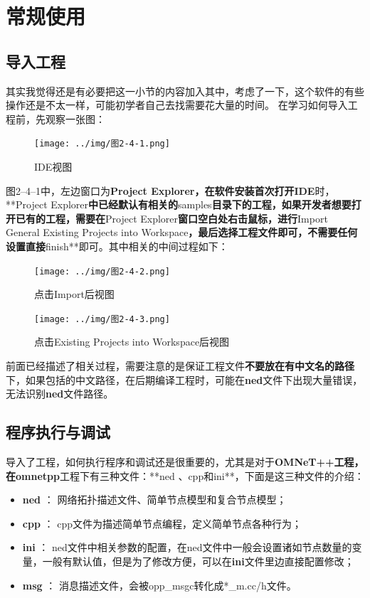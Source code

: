 \section{常规使用}
\label{常规使用}

\subsection{导入工程}
\label{导入工程}

其实我觉得还是有必要把这一小节的内容加入其中，考虑了一下，这个软件的有些操作还是不太一样，可能初学者自己去找需要花大量的时间。
在学习如何导入工程前，先观察一张图：

\begin{figure}[htbp]
\centering
\texttt{[image: ../img/图2-4-1.png]}
\caption{IDE视图}
\end{figure}

图2--4--1中，左边窗口为\textbf{Project Explorer\textbf{，在软件安装首次打开}IDE}时，**Project Explorer\textbf{中已经默认有相关的}samples\textbf{目录下的工程，如果开发者想要打开已有的工程，需要在}Project Explorer\textbf{窗口空白处右击鼠标，进行}Import \textbar{} General \textbar{} Existing Projects into Workspace\textbf{，最后选择工程文件即可，不需要任何设置直接}finish**即可。其中相关的中间过程如下：

\begin{figure}[htbp]
\centering
\texttt{[image: ../img/图2-4-2.png]}
\caption{点击Import后视图}
\end{figure}

\begin{figure}[htbp]
\centering
\texttt{[image: ../img/图2-4-3.png]}
\caption{点击Existing Projects into Workspace后视图}
\end{figure}

前面已经描述了相关过程，需要注意的是保证工程文件\textbf{不要放在有中文名的路径}下，如果包括的中文路径，在后期编译工程时，可能在\textbf{ned}文件下出现大量错误，无法识别\textbf{ned}文件路径。

\subsection{程序执行与调试}
\label{程序执行与调试}

导入了工程，如何执行程序和调试还是很重要的，尤其是对于\textbf{OMNeT++\textbf{工程，在}omnetpp}工程下有三种文件：**ned 、cpp和ini**，下面是这三种文件的介绍：

\begin{itemize}
\item \textbf{ned} ： 网络拓扑描述文件、简单节点模型和复合节点模型；

\item \textbf{cpp} ： cpp文件为描述简单节点编程，定义简单节点各种行为；

\item \textbf{ini} ： ned文件中相关参数的配置，在ned文件中一般会设置诸如节点数量的变量，一般有默认值，但是为了修改方便，可以在\textbf{ini}文件里边直接配置修改；

\item \textbf{msg} ： 消息描述文件，会被opp\_msgc转化成*\_m.cc\slash h文件。

\end{itemize}

